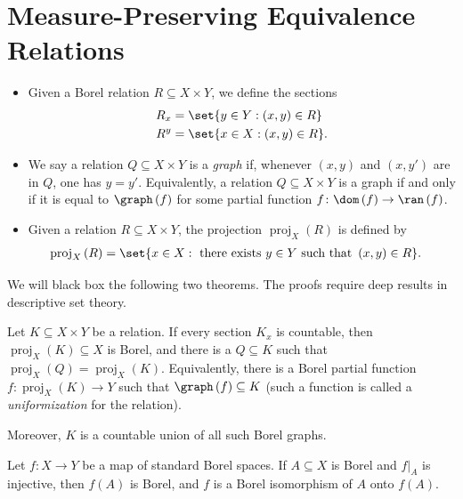 \documentclass[10pt]{mypackage}
\begin{document}
\RaggedRight
\section{Measure-Preserving Equivalence Relations}%
\begin{definition}\hfill
  \begin{itemize}
    \item Given a Borel relation $R\subseteq X\times Y$, we define the sections
      \begin{align*}
        R_x &= \set{y\in Y : \left( x,y \right)\in R}\\
        R^y &= \set{x\in X : \left( x,y \right)\in R}.
      \end{align*}
    \item We say a relation $Q\subseteq X\times Y$ is a \textit{graph} if, whenever $\left( x,y \right)$ and $\left( x,y' \right)$ are in $Q$, one has $y = y'$. Equivalently, a relation $Q\subseteq X\times Y$ is a graph if and only if it is equal to $\graph\left( f \right)$ for some partial function $f\colon \dom\left( f \right)\rightarrow \ran\left( f \right)$.
    \item Given a relation $R\subseteq X\times Y$, the projection $\operatorname{proj}_X\left( R \right)$ is defined by
      \begin{align*}
        \operatorname{proj}_X\left( R \right) &= \set{x\in X : \text{ there exists }y\in Y\text{ such that }\left( x,y \right)\in R}.
      \end{align*}
  \end{itemize}
\end{definition}
We will black box the following two theorems. The proofs require deep results in descriptive set theory.
\begin{theorem}
  Let $K\subseteq X\times Y$ be a relation. If every section $K_x$ is countable, then $\operatorname{proj}_X\left( K \right)\subseteq X$ is Borel, and there is a $Q\subseteq K$ such that $\operatorname{proj}_X\left( Q \right) = \operatorname{proj}_X\left( K \right)$. Equivalently, there is a Borel partial function $f\colon \operatorname{proj}_X\left( K \right)\rightarrow Y $ such that $\graph\left( f \right)\subseteq K$ (such a function is called a \textit{uniformization} for the relation).

  Moreover, $K$ is a countable union of all such Borel graphs.
\end{theorem}
\begin{theorem}
  Let $f\colon X\to Y$ be a map of standard Borel spaces. If $A\subseteq X$ is Borel and $f|_{A}$ is injective, then $f(A)$ is Borel, and $f$ is a Borel isomorphism of $A$ onto $f(A)$.
\end{theorem}
\end{document}
